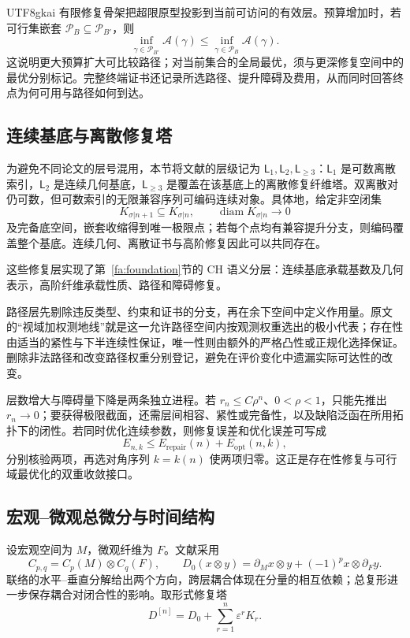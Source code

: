 \documentclass[11pt,a4paper]{article}
\theoremstyle{plain}
\theoremstyle{definition}
\theoremstyle{remark}
\begin{document}
\begin{CJK*}{UTF8}{gkai}
有限修复骨架把超限原型投影到当前可访问的有效层。预算增加时，若可行集嵌套 $\mathcal P_B\subseteq\mathcal P_{B'}$，则
\[
 \inf_{\gamma\in\mathcal P_{B'}}\mathcal A(\gamma)
 \le\inf_{\gamma\in\mathcal P_B}\mathcal A(\gamma).
\]
这说明更大预算扩大可比较路径；对当前集合的全局最优，须与更深修复空间中的最优分别标记。完整终端证书还记录所选路径、提升障碍及费用，从而同时回答终点为何可用与路径如何到达。

\subsection{连续基底与离散修复塔}

为避免不同论文的层号混用，本节将文献\cite{S26}的层级记为 $\mathsf L_1,\mathsf L_2,\mathsf L_{\ge3}$：$\mathsf L_1$ 是可数离散索引，$\mathsf L_2$ 是连续几何基底，$\mathsf L_{\ge3}$ 是覆盖在该基底上的离散修复纤维塔。双离散对仍可数，但可数索引的无限兼容序列可编码连续对象。具体地，给定非空闭集
\[
 K_{\sigma|n+1}\subseteq K_{\sigma|n},
 \qquad \operatorname{diam}K_{\sigma|n}\longrightarrow0
\]
及完备底空间，嵌套收缩得到唯一极限点；若每个点均有兼容提升分支，则编码覆盖整个基底。连续几何、离散证书与高阶修复因此可以共同存在。

这些修复层实现了第~\ref{fa:foundation}节的 CH 语义分层：连续基底承载基数及几何表示，高阶纤维承载性质、路径和障碍修复。

路径层先剔除违反类型、约束和证书的分支，再在余下空间中定义作用量。原文的“视域加权测地线”就是这一允许路径空间内按观测权重选出的极小代表；存在性由适当的紧性与下半连续性保证，唯一性则由额外的严格凸性或正规化选择保证。删除非法路径和改变路径权重分别登记，避免在评价变化中遗漏实际可达性的改变。

层数增大与障碍量下降是两条独立进程。若 $r_n\le C\rho^n$、$0<\rho<1$，只能先推出 $r_n\to0$；要获得极限截面，还需层间相容、紧性或完备性，以及缺陷泛函在所用拓扑下的闭性。若同时优化连续参数，则修复误差和优化误差可写成
\[
 E_{n,k}\le E_{\mathrm{repair}}(n)+E_{\mathrm{opt}}(n,k),
\]
分别核验两项，再选对角序列 $k=k(n)$ 使两项归零。这正是存在性修复与可行域最优化的双重收敛接口。

\subsection{宏观--微观总微分与时间结构}

设宏观空间为 $M$，微观纤维为 $F$。文献\cite{S27}采用
\[
 C_{p,q}=C_p(M)\otimes C_q(F),\qquad
 D_0(x\otimes y)=\partial_Mx\otimes y+(-1)^p x\otimes\partial_Fy.
\]
联络的水平--垂直分解给出两个方向，跨层耦合体现在分量的相互依赖；总复形进一步保存耦合对闭合性的影响。取形式修复塔
\[
 D^{[n]}=D_0+\sum_{r=1}^{n}\varepsilon^rK_r.
\]


\end{CJK*}
\end{document}
